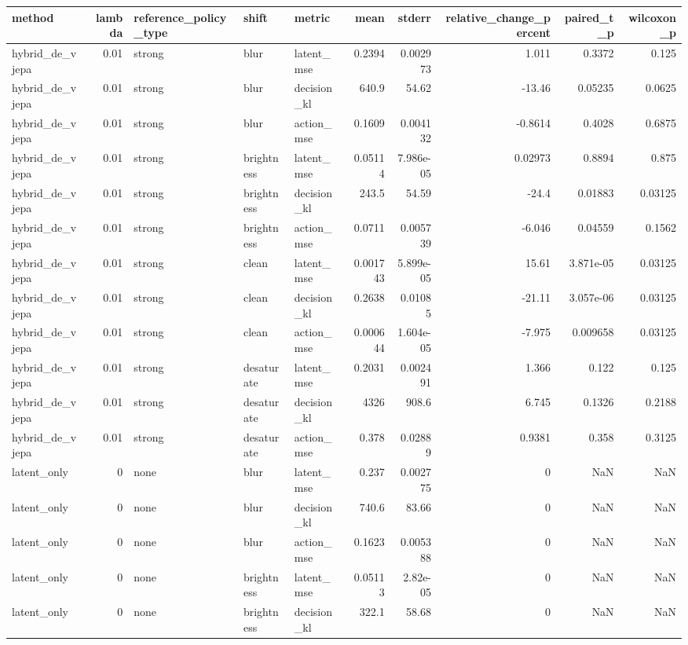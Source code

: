 \begin{tabular}{lrlllrrrrr}
\toprule
method & lambda & reference\_policy\_type & shift & metric & mean & stderr & relative\_change\_percent & paired\_t\_p & wilcoxon\_p \\
\midrule
hybrid\_de\_vjepa & 0.01 & strong & blur & latent\_mse & 0.2394 & 0.002973 & 1.011 & 0.3372 & 0.125 \\
hybrid\_de\_vjepa & 0.01 & strong & blur & decision\_kl & 640.9 & 54.62 & -13.46 & 0.05235 & 0.0625 \\
hybrid\_de\_vjepa & 0.01 & strong & blur & action\_mse & 0.1609 & 0.004132 & -0.8614 & 0.4028 & 0.6875 \\
hybrid\_de\_vjepa & 0.01 & strong & brightness & latent\_mse & 0.05114 & 7.986e-05 & 0.02973 & 0.8894 & 0.875 \\
hybrid\_de\_vjepa & 0.01 & strong & brightness & decision\_kl & 243.5 & 54.59 & -24.4 & 0.01883 & 0.03125 \\
hybrid\_de\_vjepa & 0.01 & strong & brightness & action\_mse & 0.0711 & 0.005739 & -6.046 & 0.04559 & 0.1562 \\
hybrid\_de\_vjepa & 0.01 & strong & clean & latent\_mse & 0.001743 & 5.899e-05 & 15.61 & 3.871e-05 & 0.03125 \\
hybrid\_de\_vjepa & 0.01 & strong & clean & decision\_kl & 0.2638 & 0.01085 & -21.11 & 3.057e-06 & 0.03125 \\
hybrid\_de\_vjepa & 0.01 & strong & clean & action\_mse & 0.000644 & 1.604e-05 & -7.975 & 0.009658 & 0.03125 \\
hybrid\_de\_vjepa & 0.01 & strong & desaturate & latent\_mse & 0.2031 & 0.002491 & 1.366 & 0.122 & 0.125 \\
hybrid\_de\_vjepa & 0.01 & strong & desaturate & decision\_kl & 4326 & 908.6 & 6.745 & 0.1326 & 0.2188 \\
hybrid\_de\_vjepa & 0.01 & strong & desaturate & action\_mse & 0.378 & 0.02889 & 0.9381 & 0.358 & 0.3125 \\
latent\_only & 0 & none & blur & latent\_mse & 0.237 & 0.002775 & 0 & NaN & NaN \\
latent\_only & 0 & none & blur & decision\_kl & 740.6 & 83.66 & 0 & NaN & NaN \\
latent\_only & 0 & none & blur & action\_mse & 0.1623 & 0.005388 & 0 & NaN & NaN \\
latent\_only & 0 & none & brightness & latent\_mse & 0.05113 & 2.82e-05 & 0 & NaN & NaN \\
latent\_only & 0 & none & brightness & decision\_kl & 322.1 & 58.68 & 0 & NaN & NaN \\

\end{tabular}

